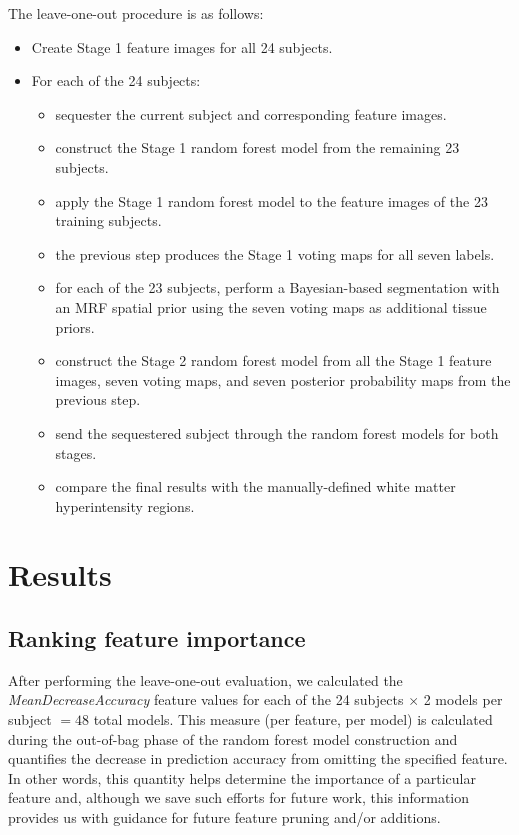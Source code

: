 \documentclass[11pt,]{article}
\providecommand{\tightlist}{%
  \setlength{\itemsep}{0pt}\setlength{\parskip}{0pt}}
\begin{document}
The leave-one-out procedure is as follows:

\begin{itemize}
\tightlist
\item
  Create Stage 1 feature images for all 24 subjects.
\item
  For each of the 24 subjects:

  \begin{itemize}
  \tightlist
  \item
    sequester the current subject and corresponding feature images.
  \item
    construct the Stage 1 random forest model from the remaining 23
    subjects.
  \item
    apply the Stage 1 random forest model to the feature images of the
    23 training subjects.
  \item
    the previous step produces the Stage 1 voting maps for all seven
    labels.
  \item
    for each of the 23 subjects, perform a Bayesian-based segmentation
    with an MRF spatial prior using the seven voting maps as additional
    tissue priors.
  \item
    construct the Stage 2 random forest model from all the Stage 1
    feature images, seven voting maps, and seven posterior probability
    maps from the previous step.
  \item
    send the sequestered subject through the random forest models for
    both stages.
  \item
    compare the final results with the manually-defined white matter
    hyperintensity regions.
  \end{itemize}
\end{itemize}

\section{Results}\label{results}

\subsection{Ranking feature
importance}\label{ranking-feature-importance}

After performing the leave-one-out evaluation, we calculated the
\emph{MeanDecreaseAccuracy} feature values for each of the 24 subjects
\(\times\) 2 models per subject \(=48\) total models. This measure (per
feature, per model) is calculated during the out-of-bag phase of the
random forest model construction and quantifies the decrease in
prediction accuracy from omitting the specified feature. In other words,
this quantity helps determine the importance of a particular feature
and, although we save such efforts for future work, this information
provides us with guidance for future feature pruning and/or additions.
\end{document}
